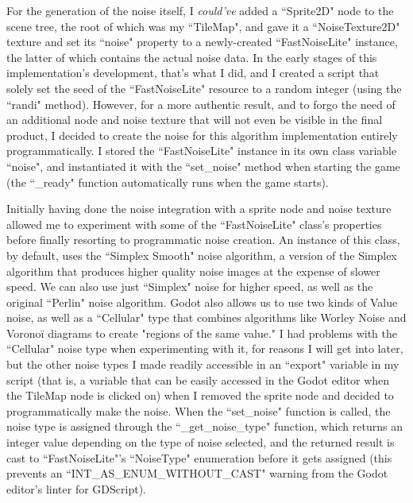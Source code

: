 For the generation of the noise itself, I \textit{could've} added a ``Sprite2D" node to the scene tree, the root of which was my ``TileMap", and gave it a ``NoiseTexture2D" texture and set its ``noise" property to a newly-created ``FastNoiseLite" instance, the latter of which contains the actual noise data. In the early stages of this implementation's development, that's what I did, and I created a script that solely set the seed of the ``FastNoiseLite" resource to a random integer (using the ``randi" method). However, for a more authentic result, and to forgo the need of an additional node and noise texture that will not even be visible in the final product, I decided to create the noise for this algorithm implementation entirely programmatically. I stored the ``FastNoiseLite" instance in its own class variable ``noise", and instantiated it with the ``set\_noise" method when starting the game (the ``\_ready" function automatically runs when the game starts).

Initially having done the noise integration with a sprite node and noise texture allowed me to experiment with some of the ``FastNoiseLite" class's properties before finally resorting to programmatic noise creation. An instance of this class, by default, uses the ``Simplex Smooth" noise algorithm, a version of the Simplex algorithm that produces higher quality noise images at the expense of slower speed.\cite{fastnoiselitedocs} We can also use just ``Simplex" noise for higher speed, as well as the original ``Perlin" noise algorithm.\cite{fastnoiselitedocs} Godot also allows us to use two kinds of Value noise, as well as a ``Cellular" type that combines algorithms like Worley Noise and Voronoï diagrams to create "regions of the same value."\cite{fastnoiselitedocs} I had problems with the ``Cellular" noise type when experimenting with it, for reasons I will get into later, but the other noise types I made readily accessible in an ``export" variable in my script (that is, a variable that can be easily accessed in the Godot editor when the TileMap node is clicked on) when I removed the sprite node and decided to programmatically make the noise. When the ``set\_noise" function is called, the noise type is assigned through the ``\_get\_noise\_type" function, which returns an integer value depending on the type of noise selected, and the returned result is cast to ``FastNoiseLite"'s ``NoiseType" enumeration\cite{fastnoiselitedocs} before it gets assigned (this prevents an ``INT\_AS\_ENUM\_WITHOUT\_CAST" warning from the Godot editor's linter for GDScript\cite{projectsettingsdocs}).

